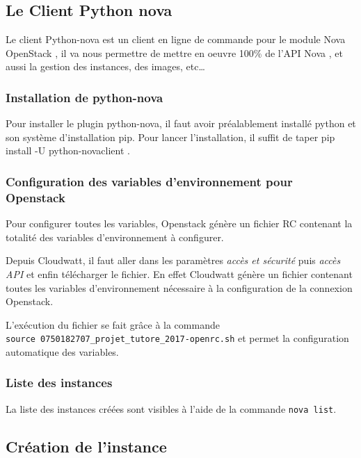 \documentclass[]{article}
\begin{document}
\subsection{Le Client Python nova}\label{le-client-python-nova}

Le client Python-nova est un client en ligne de commande pour le module
Nova OpenStack , il va nous permettre de mettre en oeuvre 100\% de l'API
Nova , et aussi la gestion des instances, des images, etc\ldots{}

\subsubsection{Installation de
python-nova}\label{installation-de-python-nova}

Pour installer le plugin python-nova, il faut avoir préalablement
installé python et son système d'installation pip. Pour lancer
l'installation, il suffit de taper pip install -U python-novaclient .

\subsubsection{Configuration des variables d'environnement pour
Openstack}\label{configuration-des-variables-denvironnement-pour-openstack}

Pour configurer toutes les variables, Openstack génère un fichier RC
contenant la totalité des variables d'environnement à configurer.

Depuis Cloudwatt, il faut aller dans les paramètres \emph{accès et
sécurité} puis \emph{accès API} et enfin télécharger le fichier. En
effet Cloudwatt génère un fichier contenant toutes les variables
d'environnement nécessaire à la configuration de la connexion Openstack.

L'exécution du fichier se fait grâce à la commande
\texttt{source\ 0750182707\_projet\_tutore\_2017-openrc.sh} et permet la
configuration automatique des variables.

\subsubsection{Liste des instances}\label{liste-des-instances}

La liste des instances créées sont visibles à l'aide de la commande
\texttt{nova\ list}.

\subsection{Création de l'instance}\label{cruxe9ation-de-linstance}
\end{document}
